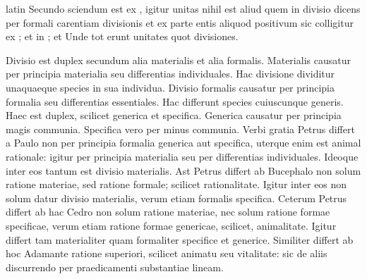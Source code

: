 \begin{otherlanguage*}{latin}
\pstart
 Secundo sciendum est ex , igitur unitas nihil est aliud quem in divisio dicens per formali carentiam divisionis et ex parte entis aliquod positivum sic colligitur ex ; et in ; et  Unde tot erunt unitates quot divisiones. 
\pend

\pstart
 Divisio est duplex secundum  alia materialis et alia formalis. Materialis causatur per principia materialia seu differentias individuales. Hac divisione dividitur unaquaeque species in sua individua. Divisio formalis causatur per principia formalia seu differentias essentiales. Hac differunt species cuiuscunque generis. Haec est duplex, scilicet generica et specifica. Generica causatur per principia magis communia. Specifica vero per minus communia. Verbi gratia Petrus differt a Paulo non per principia formalia generica aut specifica, uterque enim est animal rationale: igitur per principia materialia seu per differentias individuales. Ideoque inter eos tantum est divisio materialis. Ast Petrus differt ab Bucephalo non solum ratione materiae, sed ratione formale; scilicet rationalitate. Igitur inter eos non solum datur divisio materialis, verum etiam formalis specifica. Ceterum Petrus differt ab hac Cedro non solum ratione materiae, nec solum ratione formae specificae, verum etiam ratione formae genericae, scilicet, animalitate. Igitur differt tam materialiter quam formaliter specifice et generice. Similiter differt ab hoc Adamante ratione superiori, scilicet animatu seu vitalitate: sic de aliis discurrendo per praedicamenti substantiae lineam. 
\pend


\end{otherlanguage*}
